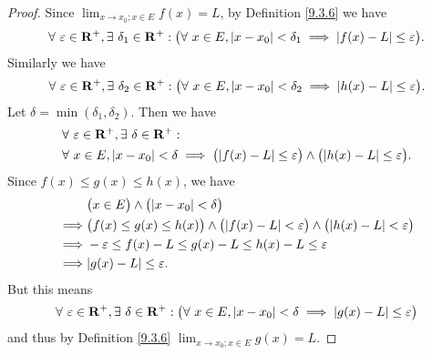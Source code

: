 \begin{proof}
    Since \(\lim_{x \to x_0 ; x \in E} f(x) = L\), by Definition \ref{9.3.6} we have
    \[
        \forall\ \varepsilon \in \mathbf{R}^+, \exists\ \delta_1 \in \mathbf{R}^+ : \big(\forall\ x \in E, \abs*{x - x_0} < \delta_1 \implies \abs*{f(x) - L} \leq \varepsilon\big).
    \]
    Similarly we have
    \[
        \forall\ \varepsilon \in \mathbf{R}^+, \exists\ \delta_2 \in \mathbf{R}^+ : \big(\forall\ x \in E, \abs*{x - x_0} < \delta_2 \implies \abs*{h(x) - L} \leq \varepsilon\big).
    \]
    Let \(\delta = \min(\delta_1, \delta_2)\).
    Then we have
    \begin{align*}
         & \forall\ \varepsilon \in \mathbf{R}^+, \exists\ \delta \in \mathbf{R}^+ :                                                                       \\
         & \forall\ x \in E, \abs*{x - x_0} < \delta \implies \big(\abs*{f(x) - L} \leq \varepsilon\big) \land \big(\abs*{h(x) - L} \leq \varepsilon\big).
    \end{align*}
    Since \(f(x) \leq g(x) \leq h(x)\), we have
    \begin{align*}
                 & \big(x \in E\big) \land \big(\abs*{x - x_0} < \delta\big)                                                                      \\
        \implies & \big(f(x) \leq g(x) \leq h(x)\big) \land \big(\abs*{f(x) - L} < \varepsilon\big) \land \big(\abs*{h(x) - L} < \varepsilon\big) \\
        \implies & -\varepsilon \leq f(x) - L \leq g(x) - L \leq h(x) - L \leq \varepsilon                                                        \\
        \implies & \abs*{g(x) - L} \leq \varepsilon.
    \end{align*}
    But this means
    \[
        \forall\ \varepsilon \in \mathbf{R}^+, \exists\ \delta \in \mathbf{R}^+ : \big(\forall\ x \in E, \abs*{x - x_0} < \delta \implies \abs*{g(x) - L} \leq \varepsilon\big)
    \]
    and thus by Definition \ref{9.3.6} \(\lim_{x \to x_0 ; x \in E} g(x) = L\).
\end{proof}